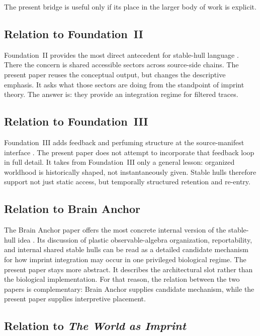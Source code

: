 \documentclass[12pt]{article}
\begin{document}
The present bridge is useful only if its place in the larger body of work is explicit.

\subsection{Relation to Foundation~II}

Foundation~II provides the most direct antecedent for stable-hull language \cite{FoundationII}. There the concern is shared accessible sectors across source-side chains. The present paper reuses the conceptual output, but changes the descriptive emphasis. It asks what those sectors are doing from the standpoint of imprint theory. The answer is: they provide an integration regime for filtered traces.

\subsection{Relation to Foundation~III}

Foundation~III adds feedback and perfuming structure at the source-manifest interface \cite{FoundationIII}. The present paper does not attempt to incorporate that feedback loop in full detail. It takes from Foundation~III only a general lesson: organized worldhood is historically shaped, not instantaneously given. Stable hulls therefore support not just static access, but temporally structured retention and re-entry.

\subsection{Relation to Brain Anchor}

The Brain Anchor paper offers the most concrete internal version of the stable-hull idea \cite{BrainAnchor}. Its discussion of plastic observable-algebra organization, reportability, and internal shared stable hulls can be read as a detailed candidate mechanism for how imprint integration may occur in one privileged biological regime. The present paper stays more abstract. It describes the architectural slot rather than the biological implementation. For that reason, the relation between the two papers is complementary: Brain Anchor supplies candidate mechanism, while the present paper supplies interpretive placement.

\subsection{Relation to \emph{The World as Imprint}}
\end{document}
